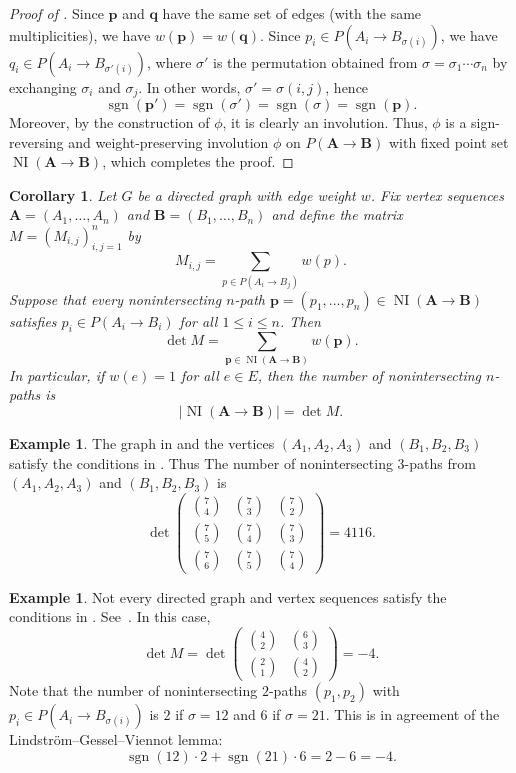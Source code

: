 \documentclass[oneside]{book}
\numberwithin{equation}{section}
\newtheorem{cor}[thm]{Corollary}
\theoremstyle{definition}
\newtheorem{exam}[thm]{Example}
\newcommand\NI{\operatorname{NI}}
\newcommand\sgn{\operatorname{sgn}}
\renewcommand\vec[1]{\mathbf{#1}}
\begin{document}
\begin{proof}[Proof of ]
Since \( \vec p \) and \( \vec q \) have the same set of edges (with
the same multiplicities), we have \( w(\vec p) = w(\vec q) \). Since
\(p_i\in P(A_i\to B_{\sigma(i)}) \), we have
\(q_i\in P(A_i\to B_{\sigma'(i)}) \), where \( \sigma' \) is the
permutation obtained from \( \sigma = \sigma_1 \cdots \sigma_n \) by
exchanging \( \sigma_i \) and \( \sigma_j \). In other words,
\( \sigma'=\sigma (i,j) \), hence
\[
  \sgn(\vec p') = \sgn(\sigma') = \sgn(\sigma) = \sgn(\vec p).
\]
Moreover, by the construction of \( \phi \), it is clearly an
involution. Thus, \( \phi \) is a sign-reversing and weight-preserving
involution \( \phi \) on \( P(\vec A\to \vec B) \) with fixed point
set \( \NI(\vec A\to \vec B) \), which completes the proof.
\end{proof}

\begin{cor}\label{cor:LGV}
  Let \( G \) be a directed graph with edge weight \( w \). Fix vertex
  sequences \( \vec A = (A_1,\dots,A_n) \) and
  \( \vec B = (B_1,\dots,B_n) \) and define the matrix
  \( M = (M_{i,j})_{i,j=1}^n \) by
\[
  M_{i,j} = \sum_{p\in P(A_i\to B_j)} w(p).
\]
Suppose that  every nonintersecting \( n \)-path 
\( \vec p = (p_1,\dots,p_n)\in \NI(\vec A \to \vec B) \)
satisfies \( p_i \in P(A_i\to B_i) \) for all \( 1\le i\le n \).
Then 
\[
  \det M = \sum_{\vec p \in \NI(\vec A \to \vec B)} w(\vec p).
\]
In particular, if \( w(e) = 1 \) for all \( e\in E \), then the number
of nonintersecting \( n \)-paths is
\[
  |\NI(\vec A \to \vec B)| = \det M.
\]
\end{cor}

\begin{exam}
  The graph in  and the vertices \( (A_1,A_2,A_3) \)
  and \( (B_1,B_2,B_3) \) satisfy the conditions in .
  Thus The number of nonintersecting \( 3 \)-paths from
  \( (A_1,A_2,A_3) \) and \( (B_1,B_2,B_3) \) is
  \[
    \det
    \begin{pmatrix}
\binom{7}{4} & \binom{7}{3} & \binom{7}{2}\\[4pt]
\binom{7}{5} & \binom{7}{4} & \binom{7}{3}\\[4pt]
\binom{7}{6} & \binom{7}{5} & \binom{7}{4}
\end{pmatrix} = 4116.
  \]
\end{exam}

\begin{exam}
  Not every directed graph and vertex sequences satisfy the conditions
  in . See~.
  In this case,
  \[
   \det M =  \det
    \begin{pmatrix}
\binom{4}{2} & \binom{6}{3}\\[4pt]
\binom{2}{1} & \binom{4}{2}
\end{pmatrix} = -4.
  \]
  Note that the number of nonintersecting \( 2 \)-paths
  \( (p_1,p_2) \) with \( p_i\in P(A_i\to B_{\sigma(i)}) \) is \( 2 \)
  if \( \sigma = 12 \) and \( 6 \) if \( \sigma = 21 \).
  This is in agreement of the Lindstr\"om--Gessel--Viennot lemma:
  \[
    \sgn(12) \cdot 2 + \sgn(21) \cdot 6 = 2-6 = -4.
  \]
\end{exam}
\end{document}
